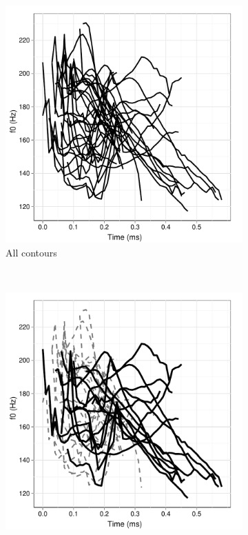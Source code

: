\documentclass[12pt]{article}
\begin{document}
\begin{figure}[h]
  \centering
  \begin{subfigure}[t]{0.48\textwidth}
    \centering
    \includegraphics[width=\textwidth]{kiy-20111208-plot-unexplained}%
    \caption{All contours}
    \label{fig:plot-unexplained2}
  \end{subfigure}
~
  \begin{subfigure}[t]{0.48\textwidth}
    \centering
    \includegraphics[width=\textwidth]{kiy-20111208-plot-iso}%

\end{subfigure}
\end{figure}
\end{document}
